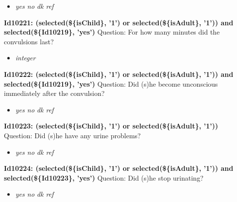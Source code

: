 \documentclass{article}%
\begin{document}
%
\begin{itemize}%
\item%
\textit{yes\newline%
 no\newline%
 dk\newline%
 ref\newline%
}%
\end{itemize}%
\textbf{Id10221: (selected(\$\{isChild\}, '1') or selected(\$\{isAdult\}, '1')) and selected(\$\{Id10219\}, 'yes')\newline%
}%
Question: For how many minutes did the convulsions last?\newline%
%
\begin{itemize}%
\item%
\textit{integer\newline%
}%
\end{itemize}%
\textbf{Id10222: (selected(\$\{isChild\}, '1') or selected(\$\{isAdult\}, '1')) and selected(\$\{Id10219\}, 'yes')\newline%
}%
Question: Did (s)he become unconscious immediately after the convulsion?\newline%
%
\begin{itemize}%
\item%
\textit{yes\newline%
 no\newline%
 dk\newline%
 ref\newline%
}%
\end{itemize}%
\textbf{Id10223: (selected(\$\{isChild\}, '1') or selected(\$\{isAdult\}, '1'))\newline%
}%
Question: Did (s)he have any urine problems?\newline%
%
\begin{itemize}%
\item%
\textit{yes\newline%
 no\newline%
 dk\newline%
 ref\newline%
}%
\end{itemize}%
\textbf{Id10224: (selected(\$\{isChild\}, '1') or selected(\$\{isAdult\}, '1')) and selected(\$\{Id10223\}, 'yes')\newline%
}%
Question: Did (s)he stop urinating?\newline%
%
\begin{itemize}%
\item%
\textit{yes\newline%
 no\newline%
 dk\newline%
 ref\newline%
}%
\end{itemize}%
\end{document}
